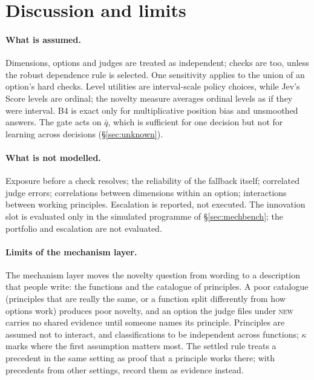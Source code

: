 \documentclass[11pt]{article}
\theoremstyle{definition}
\begin{document}
\section{Discussion and limits}

\paragraph{What is assumed.} Dimensions, options and judges are treated as independent; checks are
too, unless the robust dependence rule is selected. One sensitivity applies to the union of an
option's hard checks. Level utilities are interval-scale policy choices, while Jev's Score levels
are ordinal; the novelty measure averages ordinal levels as if they were interval. B4 is exact only
for multiplicative position bias and unsmoothed answers. The gate acts on $\bar q$, which is
sufficient for one decision but not for learning across decisions (\S\ref{sec:unknown}).

\paragraph{What is not modelled.} Exposure before a check resolves; the reliability of the fallback
itself; correlated judge errors; correlations between dimensions within an option; interactions
between working principles. Escalation is reported, not executed. The innovation slot is evaluated
only in the simulated programme of \S\ref{sec:mechbench}; the portfolio and escalation are not
evaluated.

\paragraph{Limits of the mechanism layer.} The mechanism layer moves the novelty question from wording to a
description that people write: the functions and the catalogue of principles. A poor catalogue
(principles that are really the same, or a function split differently from how options work)
produces poor novelty, and an option the judge files under \textsc{new} carries no shared evidence
until someone names its principle. Principles are assumed not to interact, and classifications to
be independent across functions; $\kappa$ marks where the first assumption matters most. The
settled rule treats a precedent in the same setting as proof that a principle works there; with
precedents from other settings, record them as evidence instead.
\end{document}
